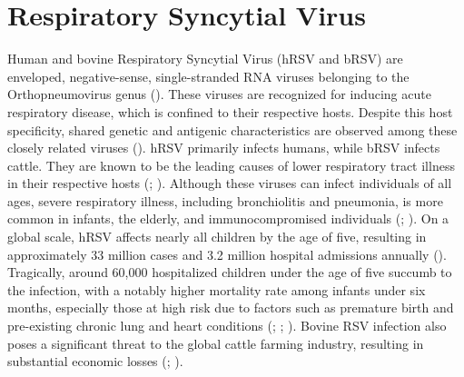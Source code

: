 \section{Respiratory Syncytial Virus} \label{sec:Respiratory Syncytial Virus}
Human and bovine Respiratory Syncytial Virus (hRSV and bRSV) are enveloped, negative-sense, single-stranded RNA viruses belonging to the Orthopneumovirus genus (\cite{Afonso2016Taxonomy2016.}). These viruses are recognized for inducing acute respiratory disease, which is confined to their respective hosts. Despite this host specificity, shared genetic and antigenic characteristics are observed among these closely related viruses (\cite{Buchholz2000ChimericVaccine}). hRSV primarily infects humans, while bRSV infects cattle. They are known to be the leading causes of lower respiratory tract illness in their respective hosts (\cite{Nair2013GlobalAnalysis.}; \cite{Sacco2014RespiratoryCattle}). Although these viruses can infect individuals of all ages, severe respiratory illness, including bronchiolitis and pneumonia, is more common in infants, the elderly, and immunocompromised individuals (\cite{AR2005RespiratoryAdults}; \cite{Coultas2019RespiratoryAge}). On a global scale, hRSV affects nearly all children by the age of five, resulting in approximately 33 million cases and 3.2 million hospital admissions annually (\cite{Shi2017GlobalStudy}). Tragically, around 60,000 hospitalized children under the age of five succumb to the infection, with a notably higher mortality rate among infants under six months, especially those at high risk due to factors such as premature birth and pre-existing chronic lung and heart conditions (\cite{Shi2017GlobalStudy}; \cite{Jha2016RespiratoryVirus}; \cite{Coultas2019RespiratoryAge}). Bovine RSV infection also poses a significant threat to the global cattle farming industry, resulting in substantial economic losses (\cite{Brodersen2010BovineVirus}; \cite{Valarcher2007BovineInfection}).

